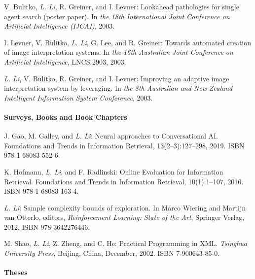 \documentclass[10pt,twoside,letterpaper]{article}
\newcommand{\selffont}[1]{{\textit{#1}}}
\newcommand{\venuefont}[1]{{\textit{#1}}}
\newcommand{\negitemspace}{\vspace{1mm}}
\newcommand{\myself}{\selffont{L. Li}}
\begin{document}
\begin{compactenum}[(C1)]
\item{V. Bulitko, \myself, R. Greiner, and I. Levner: Lookahead pathologies for single agent search (poster paper). In \venuefont{the 18th International Joint Conference on Artificial Intelligence (IJCAI)}, 2003.}

\item{I. Levner, V. Bulitko, \myself, G. Lee, and R. Greiner: Towards automated creation of image interpretation systems. In \venuefont{the 16th Australian Joint Conference on Artificial
Intelligence}, LNCS 2903, 2003.}

\item{\myself, V. Bulitko, R. Greiner, and I. Levner: Improving an adaptive image interpretation system by leveraging. In \venuefont{the 8th Australian and New Zealand Intelligent Information System Conference}, 2003.}

\end{compactenum} \negitemspace

\paragraph{Surveys, Books and Book Chapters} \negitemspace

\begin{compactenum}[(B1)]

\item{J. Gao, M. Galley, and \myself: Neural approaches to Conversational AI.  Foundations and Trends in Information Retrieval, 13(2--3):127--298, 2019.  ISBN 978-1-68083-552-6.}

\item{K. Hofmann, \myself, and F. Radlinski: Online Evaluation for Information Retrieval.  Foundations and Trends in Information Retrieval, 10(1):1--107, 2016. ISBN 978-1-68083-163-4.}

\item{\myself: Sample complexity bounds of exploration.  In Marco Wiering and Martijn van Otterlo, editors, \venuefont{Reinforcement Learning: State of the Art}, Springer Verlag, 2012.  ISBN 978-3642276446.}

\item{M. Shao, \myself, Z. Zheng, and C. He: Practical Programming in XML. \venuefont{Tsinghua University Press}, Beijing, China, December, 2002. ISBN 7-900643-85-0.}

\end{compactenum} \negitemspace

\paragraph{Theses} \negitemspace
\end{document}
